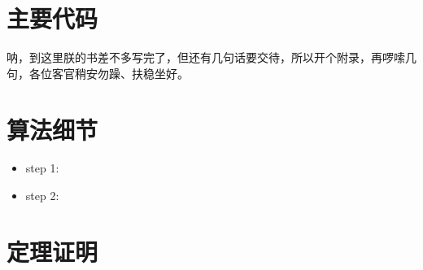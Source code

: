 \documentclass[]{ctexbook}
\providecommand{\tightlist}{%
  \setlength{\itemsep}{0pt}\setlength{\parskip}{0pt}}
\theoremstyle{definition}
\theoremstyle{definition}
\theoremstyle{definition}
\theoremstyle{remark}
\begin{document}
\cleardoublepage 

\appendix {}


\chapter{主要代码}\label{sound}

呐，到这里朕的书差不多写完了，但还有几句话要交待，所以开个附录，再啰嗦几句，各位客官稍安勿躁、扶稳坐好。

\chapter{算法细节}

\begin{itemize}
\tightlist
\item
  step 1:
\item
  step 2:
\end{itemize}

\chapter{定理证明}



\backmatter
\printindex
\end{document}
